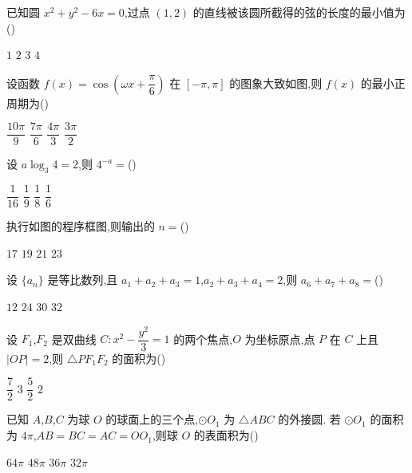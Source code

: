 \begin{problem}
已知圆 \(x^2+y^2-6x=0\),过点 \((1,2)\) 的直线被该圆所截得的弦的长度的最小值为(\quad)

\choices
    {\(1\)}
    {\(2\)}
    {\(3\)}
    {\(4\)}
\end{problem}

\begin{problem}
设函数 \(f(x)=\cos\left(\omega x+\dfrac{\pi}{6}\right)\) 在 \([-\pi,\pi]\) 的图象大致如图,则 \(f(x)\) 的最小正周期为(\quad)


\choices
    {\(\dfrac{10\pi}{9}\)}
    {\(\dfrac{7\pi}{6}\)}
    {\(\dfrac{4\pi}{3}\)}
    {\(\dfrac{3\pi}{2}\)}
\end{problem}

\begin{problem}
设 \(a\log_3 4=2\),则 \(4^{-a}=\)(\quad)

\choices
    {\(\dfrac{1}{16}\)}
    {\(\dfrac{1}{9}\)}
    {\(\dfrac{1}{8}\)}
    {\(\dfrac{1}{6}\)}
\end{problem}

\begin{problem}
执行如图的程序框图,则输出的 \(n=\)(\quad)


\choices
    {\(17\)}
    {\(19\)}
    {\(21\)}
    {\(23\)}
\end{problem}

\begin{problem}
设 \(\{a_n\}\) 是等比数列,且 \(a_1+a_2+a_3=1\),\(a_2+a_3+a_4=2\),则 \(a_6+a_7+a_8=\)(\quad)

\choices
    {\(12\)}
    {\(24\)}
    {\(30\)}
    {\(32\)}
\end{problem}

\begin{problem}
设 \(F_1\),\(F_2\) 是双曲线 \(C:x^2-\dfrac{y^2}{3}=1\) 的两个焦点,\(O\) 为坐标原点,点 \(P\) 在 \(C\) 上且 \(\lvert OP\rvert=2\),则 \(\triangle PF_1F_2\) 的面积为(\quad)

\choices
    {\(\dfrac{7}{2}\)}
    {\(3\)}
    {\(\dfrac{5}{2}\)}
    {\(2\)}
\end{problem}

\begin{problem}
已知 \(A\),\(B\),\(C\) 为球 \(O\) 的球面上的三个点,\(\odot O_1\) 为 \(\triangle ABC\) 的外接圆. 若 \(\odot O_1\) 的面积为 \(4\pi\),\(AB=BC=AC=OO_1\),则球 \(O\) 的表面积为(\quad)

\choices
    {\(64\pi\)}
    {\(48\pi\)}
    {\(36\pi\)}
    {\(32\pi\)}
\end{problem}


